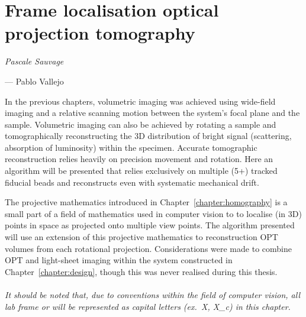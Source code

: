 \ifpdf
    \graphicspath{{Chapters/flopt/Figs/Raster/}{Chapters/flopt/Figs/PDF/}{Chapters/flopt/Figs/}}
\else
    \graphicspath{{Chapters/flopt/Figs/Vector/}{Chapters/flopt/Figs/}}
\fi


\makeatletter
\renewcommand*\env@matrix[1][*\c@MaxMatrixCols c]{%
   \hskip -\arraycolsep
   \let\@ifnextchar\new@ifnextchar
   \array{#1}}
\makeatother

\chapter{Frame localisation optical projection tomography}\label{chapter:flopt}

\epigraph{\emph{Pascale Sauvage}}{--- Pablo Vallejo}

In the previous chapters, volumetric imaging was achieved using \gls{wide-field} imaging and a relative scanning motion between the system's focal plane and the sample.
Volumetric imaging can also be achieved by rotating a sample and %
tomographically reconstructing the \gls{3D} distribution of bright signal (scattering, absorption of luminosity) within the specimen.
Accurate %
tomographic reconstruction relies
heavily on precision movement and rotation.
Here an algorithm will be presented that relies exclusively on multiple (5+) tracked fiducial beads and reconstructs even with systematic mechanical drift.

The projective mathematics introduced in Chapter~\ref{chapter:homography} is a small part of a field of mathematics used in computer vision to to localise (in \gls{3D}) points in space as projected onto multiple view points.
The algorithm presented will use an extension of this projective mathematics to reconstruction \gls{OPT} volumes from each rotational projection.
Considerations were made to combine \gls{OPT} and \gls{light-sheet} imaging within the system constructed in Chapter~\ref{chapter:design}, though this was never realised during this thesis.
\\\\
\emph{It should be noted that, due to conventions within the field of computer vision, all lab frame or  will be represented as capital letters (ex.~\gls{X}, \gls{X_c}) in this chapter.}


